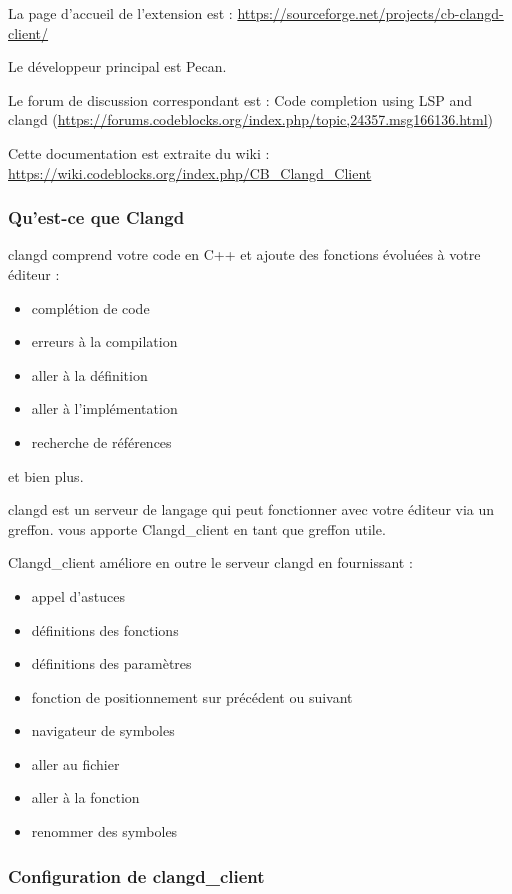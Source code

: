 La page d'accueil de l'extension est : \url{https://sourceforge.net/projects/cb-clangd-client/}

Le développeur principal est Pecan.

Le forum de discussion correspondant est : Code completion using LSP and clangd\newline
(\url{https://forums.codeblocks.org/index.php/topic,24357.msg166136.html})

Cette documentation est extraite du wiki : \url{https://wiki.codeblocks.org/index.php/CB_Clangd_Client}

\subsubsection{Qu'est-ce que Clangd}

clangd comprend votre code en C++ et ajoute des fonctions évoluées à votre éditeur :
\begin{itemize}[noitemsep]
\item complétion de code
\item erreurs à la compilation
\item aller à la définition
\item aller à l'implémentation
\item recherche de références
\end{itemize}
et bien plus.

clangd est un serveur de langage qui peut fonctionner avec votre éditeur via un greffon.\newline
\codeblocks vous apporte Clangd\_client en tant que greffon utile.

Clangd\_client améliore en outre le serveur clangd en fournissant :
\begin{itemize}[noitemsep]
\item appel d'astuces
\item définitions des fonctions
\item définitions des paramètres
\item fonction de positionnement sur précédent ou suivant
\item navigateur de symboles
\item aller au fichier
\item aller à la fonction
\item renommer des symboles
\end{itemize}

\subsubsection{Configuration de clangd\_client}\label{sec:cfg_client}

